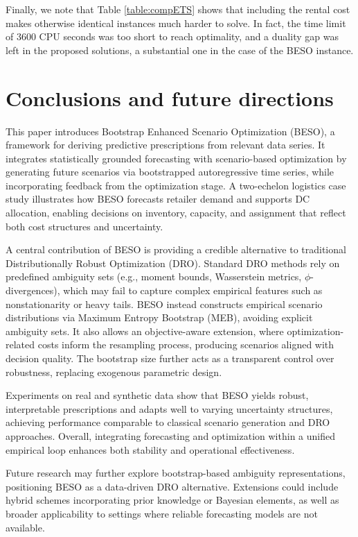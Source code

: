 \documentclass[ijoc,sglanonrev]{informs4}
\begin{document}
Finally, we note that Table \ref{table:compETS} shows that including the rental cost makes otherwise identical instances much harder to solve. In fact, the time limit of 3600 CPU seconds was too short to reach optimality, and a duality gap was left in the proposed solutions, a substantial one in the case of the BESO instance.

\section{Conclusions and future directions} \label{Sec:conclusions}

This paper introduces Bootstrap Enhanced Scenario Optimization (BESO), a framework for deriving predictive prescriptions from  relevant data series. It integrates statistically grounded forecasting with scenario-based optimization by generating future scenarios via bootstrapped autoregressive time series, while incorporating feedback from the optimization stage. A two-echelon logistics case study illustrates how BESO forecasts retailer demand and supports DC allocation, enabling decisions on inventory, capacity, and assignment that reflect both cost structures and uncertainty.

A central contribution of BESO is providing a credible alternative to traditional Distributionally Robust Optimization (DRO). Standard DRO methods rely on predefined ambiguity sets (e.g., moment bounds, Wasserstein metrics, $\phi$-divergences), which may fail to capture complex empirical features such as nonstationarity or heavy tails. BESO instead constructs empirical scenario distributions via Maximum Entropy Bootstrap (MEB), avoiding explicit ambiguity sets. It also allows an objective-aware extension, where optimization-related costs inform the resampling process, producing scenarios aligned with decision quality. The bootstrap size further acts as a transparent control over robustness, replacing exogenous parametric design.

Experiments on real and synthetic data show that BESO yields robust, interpretable prescriptions and adapts well to varying uncertainty structures, achieving performance comparable to classical scenario generation and DRO approaches. Overall, integrating forecasting and optimization within a unified empirical loop enhances both stability and operational effectiveness.

Future research may further explore bootstrap-based ambiguity representations, positioning BESO as a data-driven DRO alternative. Extensions could include hybrid schemes incorporating prior knowledge or Bayesian elements, as well as broader applicability to settings where reliable forecasting models are not available.


\end{document}

